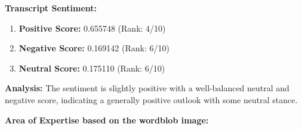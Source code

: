 \documentclass{article}
\begin{document}
\large{\textbf{Transcript Sentiment:}}
\begin{tcolorbox}[colback=green!5!white,colframe=green!75!black,title=Sentiment Breakdown]
    \begin{enumerate}
        \item \textbf{Positive Score:} \textcolor{green!70!black}{0.655748} (Rank: 4/10)
        \item \textbf{Negative Score:} \textcolor{red!70!black}{0.169142} (Rank: 6/10)
        \item \textbf{Neutral Score:} \textcolor{blue!70!black}{0.175110} (Rank: 6/10)
    \end{enumerate}
\end{tcolorbox}
\textbf{Analysis:} The sentiment is slightly positive with a well-balanced neutral and negative score, indicating a generally positive outlook with some neutral stance.\\

\vspace{0.3in}

\LARGE \textbf{Area of Expertise based on the wordblob image:} \normalsize
\end{document}

